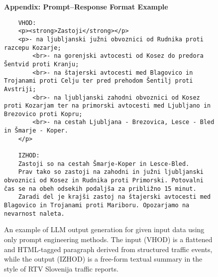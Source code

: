 \begin{figure*}[t]
    \centering
    \caption*{\textbf{Appendix: Prompt–Response Format Example}}

    \begin{verbatim}
    VHOD:
    <p><strong>Zastoji</strong></p>
    <p>- na ljubljanski južni obvoznici od Rudnika proti razcepu Kozarje;
        <br>- na gorenjski avtocesti od Kosez do predora Šentvid proti Kranju;
        <br>- na štajerski avtocesti med Blagovico in Trojanami proti Celju ter pred prehodom Šentilj proti Avstriji;
        <br>- na ljubljanski zahodni obvoznici od Kosez proti Kozarjam ter na primorski avtocesti med Ljubljano in Brezovico proti Kopru;
        <br>- na cestah Ljubljana - Brezovica, Lesce - Bled in Šmarje - Koper.
    </p>

    IZHOD:
    Zastoji so na cestah Šmarje-Koper in Lesce-Bled.
    Prav tako so zastoji na zahodni in južni ljubljanski obvoznici od Kosez in Rudnika proti Primorski. Potovalni čas se na obeh odsekih podaljša za približno 15 minut.
    Zaradi del je krajši zastoj na štajerski avtocesti med Blagovico in Trojanami proti Mariboru. Opozarjamo na nevarnost naleta.
    \end{verbatim}

    \caption{An example of LLM output generation for given input data using only prompt engineering methods. 
    The input (VHOD) is a flattened and HTML-tagged paragraph derived from structured traffic events, while the output (IZHOD) is a free-form textual summary in the style of RTV Slovenija traffic reports.}
    \label{fig:result_baseline}
\end{figure*}


